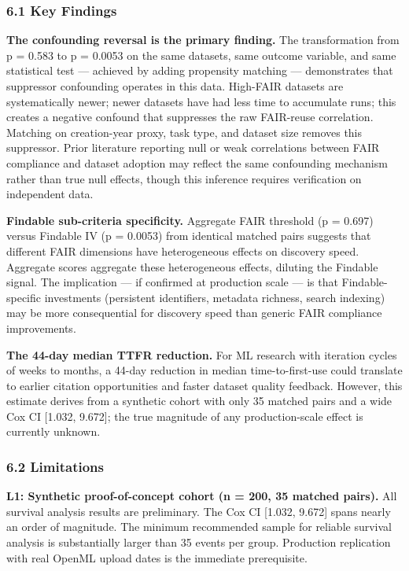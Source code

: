 
\subsubsection{6.1 Key Findings}

\textbf{The confounding reversal is the primary finding.} The transformation from p = 0.583 to p = 0.0053 on the same datasets, same outcome variable, and same statistical test — achieved by adding propensity matching — demonstrates that suppressor confounding operates in this data. High-FAIR datasets are systematically newer; newer datasets have had less time to accumulate runs; this creates a negative confound that suppresses the raw FAIR-reuse correlation. Matching on creation-year proxy, task type, and dataset size removes this suppressor. Prior literature reporting null or weak correlations between FAIR compliance and dataset adoption may reflect the same confounding mechanism rather than true null effects, though this inference requires verification on independent data.

\textbf{Findable sub-criteria specificity.} Aggregate FAIR threshold (p = 0.697) versus Findable IV (p = 0.0053) from identical matched pairs suggests that different FAIR dimensions have heterogeneous effects on discovery speed. Aggregate scores aggregate these heterogeneous effects, diluting the Findable signal. The implication — if confirmed at production scale — is that Findable-specific investments (persistent identifiers, metadata richness, search indexing) may be more consequential for discovery speed than generic FAIR compliance improvements.

\textbf{The 44-day median TTFR reduction.} For ML research with iteration cycles of weeks to months, a 44-day reduction in median time-to-first-use could translate to earlier citation opportunities and faster dataset quality feedback. However, this estimate derives from a synthetic cohort with only 35 matched pairs and a wide Cox CI [1.032, 9.672]; the true magnitude of any production-scale effect is currently unknown.

\subsubsection{6.2 Limitations}

\textbf{L1: Synthetic proof-of-concept cohort (n = 200, 35 matched pairs).} All survival analysis results are preliminary. The Cox CI [1.032, 9.672] spans nearly an order of magnitude. The minimum recommended sample for reliable survival analysis is substantially larger than 35 events per group. Production replication with real OpenML upload dates is the immediate prerequisite.


